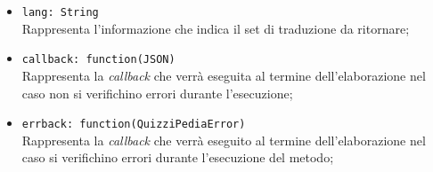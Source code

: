 \begin{itemize}
\begin{itemize}
\begin{itemize}
						\item \texttt{lang: String} \\
						Rappresenta l'informazione che indica il set di traduzione da ritornare;
						\item \texttt{callback: function(JSON)} \\
						Rappresenta la \textit{callback} che verrà eseguita al termine dell'elaborazione nel caso non si verifichino errori durante l'esecuzione;
						\item \texttt{errback: function(QuizziPediaError)} \\
						Rappresenta la \textit{callback} che verrà eseguito al termine dell'elaborazione nel caso si verifichino errori durante l'esecuzione del metodo;
					\end{itemize}
			\end{itemize}
	\end{itemize}
	